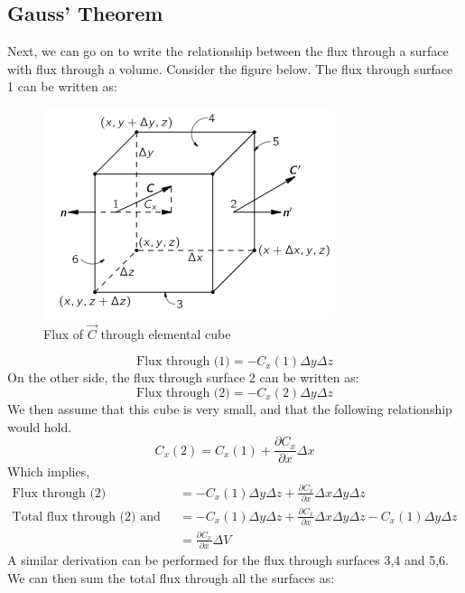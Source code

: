 \subsection{Gauss' Theorem}
Next, we can go on to write the relationship between the flux through a surface with flux through a volume. Consider the figure below. The flux through surface 1 can be written as: 
\begin{figure}[H]
    \centering
    \includegraphics[scale = 0.6]{math prelim/images_math prelim/cube}
    \caption{Flux of $\vec{C}$ through elemental cube}
    \label{cube}
\end{figure}
\begin{equation}
	\text{Flux through (1)} = -C_{x}(1)\Delta y \Delta z
\end{equation}
On the other side, the flux through surface 2 can be written as: 
\begin{equation}
	\text{Flux through (2)} = -C_{x}(2)\Delta y \Delta z
\end{equation}
We then assume that this cube is very small, and that the following relationship would hold. 
\begin{equation}
	C_{x}(2) = C_{x}(1) + \frac{\partial C_{x}}{\partial x} \Delta x
\end{equation}
Which implies, 
\begin{align} 
	\text{Flux through (2)} &= -C_{x}(1)\Delta y \Delta z + \frac{\partial C_{x}}{\partial x} \Delta x \Delta y \Delta z\\
	\text{Total flux through (2) and (1)} &= -C_{x}(1)\Delta y \Delta z + \frac{\partial C_{x}}{\partial x} \Delta x \Delta y \Delta z -C_{x}(1)\Delta y \Delta z \\
	&= \frac{\partial C_{x}}{\partial x} \Delta V
\end{align}
A similar derivation can be performed for the flux through surfaces 3,4 and 5,6. We can then sum the total flux through all the surfaces as: 
